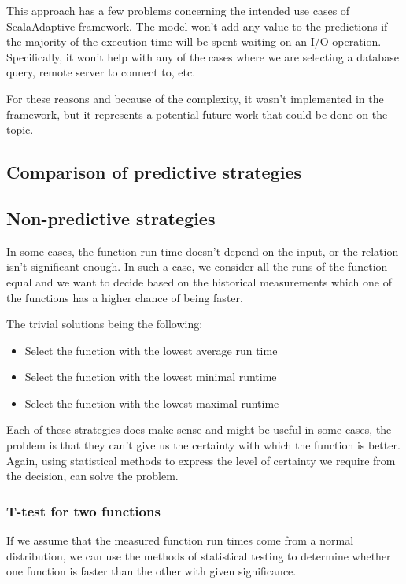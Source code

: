 This approach has a few problems concerning the intended use cases of ScalaAdaptive framework. The model won't add any value to the predictions if the majority of the execution time will be spent waiting on an I/O operation. Specifically, it won't help with any of the cases where we are selecting a database query, remote server to connect to, etc.

For these reasons and because of the complexity, it wasn't implemented in the framework, but it represents a potential future work that could be done on the topic.

\subsection{Comparison of predictive strategies}

\subsection{Non-predictive strategies}

In some cases, the function run time doesn't depend on the input, or the relation isn't significant enough. In such a case, we consider all the runs of the function equal and we want to decide based on the historical measurements which one of the functions has a higher chance of being faster.

The trivial solutions being the following:
\begin{itemize}
	\item Select the function with the lowest average run time
	\item Select the function with the lowest minimal runtime
	\item Select the function with the lowest maximal runtime
\end{itemize}

Each of these strategies does make sense and might be useful in some cases, the problem is that they can't give us the certainty with which the function is better. Again, using statistical methods to express the level of certainty we require from the decision, can solve the problem.

\subsubsection{T-test for two functions}

If we assume that the measured function run times come from a normal distribution, we can use the methods of statistical testing to determine whether one function is faster than the other with given significance. 

